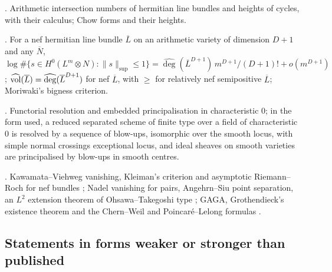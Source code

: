 \begin{description}[leftmargin=0pt,itemsep=1pt,parsep=0pt,font=\normalfont\itshape]
\item[Arithmetic intersection theory] \cite{GilletSoule1990,BostGilletSoule1994,Philippon1991}.
  Arithmetic intersection numbers of hermitian line bundles and heights of cycles, with their
  calculus; Chow forms and their heights.  
\item[Arithmetic Hilbert--Samuel theorem and volumes]
  \cite{GilletSoule1992,AbbesBouche1995,Zhang1995,Moriwaki2009,Yuan2008}.  For a nef hermitian line
  bundle $\overline L$ on an arithmetic variety of dimension $D+1$ and any $\overline N$,
  $\log\#\{s\in H^0(L^m\otimes N):\|s\|_{\sup}\le1\}=\widehat{\deg}(\overline L^{D+1})\,m^{D+1}/(D+1)!+o(m^{D+1})$;
  $\widehat{\operatorname{vol}}(\overline L)=\widehat{\deg}(\overline L^{D+1})$ for nef $\overline L$, with $\ge$
  for relatively nef semipositive $\overline L$; Moriwaki's bigness criterion.
\item[Resolution of singularities] \cite{Hironaka1964,BierstoneMilman1997,Wlodarczyk2005,Kollar2007}.
  Functorial resolution and embedded principalisation in characteristic $0$; in the form used, a
  reduced separated scheme of finite type over a field of characteristic $0$ is resolved by a
  sequence of blow-ups, isomorphic over the smooth locus, with simple normal crossings exceptional
  locus, and ideal sheaves on smooth varieties are principalised by blow-ups in smooth centres.
   
\item[Vanishing and positivity]
  \cite{Kawamata1982,Viehweg1982,Nadel1990,AngehrnSiu1995,OhsawaTakegoshi1987,Lazarsfeld2004}.
  Kawamata--Viehweg vanishing, Kleiman's criterion and asymptotic Riemann--Roch for nef bundles
  ; Nadel vanishing for pairs, Angehrn--Siu point separation, an $L^2$
  extension theorem of Ohsawa--Takegoshi type ; GAGA, Grothendieck's
  existence theorem and the Chern--Weil and Poincar\'e--Lelong formulas \cite{Serre1956,Grothendieck1961}
  .
\end{description}

\subsection{Statements in forms weaker or stronger than published}\label{sec:literature:forms}

